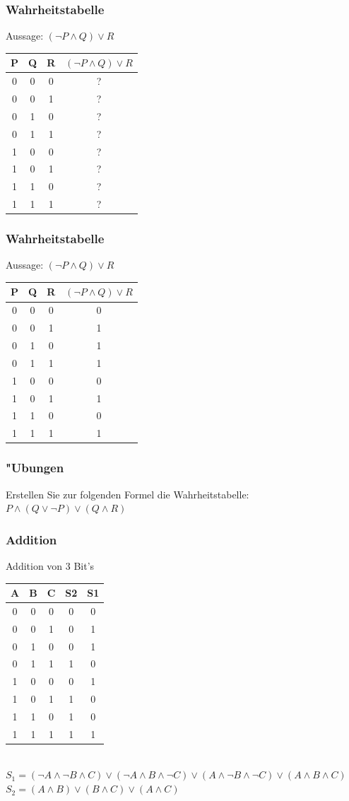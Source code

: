 \documentclass{beamer}
\begin{document}
\frame
{
	\frametitle{Wahrheitstabelle}
	Aussage: $(\lnot P \land Q) \lor R$\\
	\vspace{4mm}
	\begin{tabular}{c|c|c|c}
	P & Q & R & $(\lnot P \land Q) \lor R$ \\
	\hline
	0 & 0 & 0 & ?\\
	0 & 0 & 1 & ?\\
	0 & 1 & 0 & ?\\
	0 & 1 & 1 & ?\\
	1 & 0 & 0 & ?\\
	1 & 0 & 1 & ?\\
	1 & 1 & 0 & ?\\
	1 & 1 & 1 & ?\\
	\end{tabular}
}

\frame
{
	\frametitle{Wahrheitstabelle}
	Aussage: $(\lnot P \land Q) \lor R$\\
	\vspace{4mm}
	\begin{tabular}{c|c|c|c}
	P & Q & R & $(\lnot P \land Q) \lor R$ \\
	\hline
	0 & 0 & 0 & 0\\
	0 & 0 & 1 & 1\\
	0 & 1 & 0 & 1\\
	0 & 1 & 1 & 1\\
	1 & 0 & 0 & 0\\
	1 & 0 & 1 & 1\\
	1 & 1 & 0 & 0\\
	1 & 1 & 1 & 1\\
	\end{tabular}
}

\frame
{
	\frametitle{"Ubungen}
	Erstellen Sie zur folgenden Formel die Wahrheitstabelle:\\
	$P \land (Q \lor \lnot P) \lor (Q \land R)$
}

\frame
{
	\frametitle{Addition}
	{\small
	Addition von 3 Bit's\\
	\vspace{4mm}
	\begin{tabular}{c|c|c|c|c}
	A & B & C & S2 & S1 \\
	\hline
	0 & 0 & 0 & 0 & 0\\
	0 & 0 & 1 & 0 & 1\\
	0 & 1 & 0 & 0 & 1\\
	0 & 1 & 1 & 1 & 0\\
	1 & 0 & 0 & 0 & 1\\
	1 & 0 & 1 & 1 & 0\\
	1 & 1 & 0 & 1 & 0\\
	1 & 1 & 1 & 1 & 1\\
	\end{tabular}\\
	\vspace{4mm}
	$S_1 = (\lnot A \land \lnot B \land C) \lor (\lnot A \land B \land \lnot C) \lor (A \land \lnot B \land \lnot C) \lor (A \land B \land C)$\\
	$S_2 = (A \land B) \lor (B \land C) \lor (A \land C)$
	}
}
\end{document}
